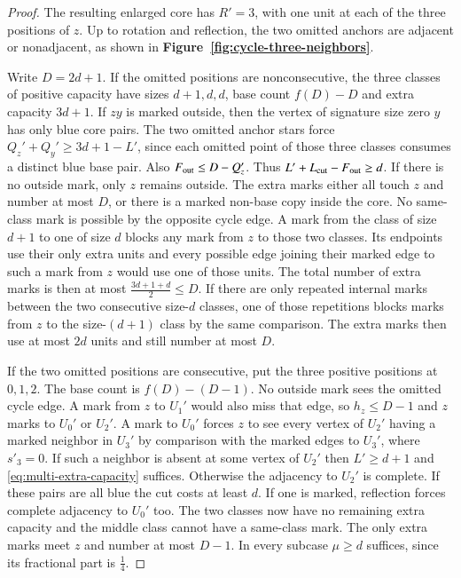 \begin{proof}
The resulting enlarged core has $R'=3$, with one unit at each of the
three positions of $z$. Up to rotation and reflection, the two omitted
anchors are adjacent or nonadjacent, as shown in
\textbf{Figure~\ref{fig:cycle-three-neighbors}}.


Write $D=2d+1$. If the omitted positions are
nonconsecutive, the three classes of positive capacity have sizes
$d+1,d,d$, base count $f(D)-D$ and extra capacity $3d+1$.
If $zy$ is marked outside, then the vertex of signature size zero $y$ has
only blue core pairs. The two omitted anchor stars force
$Q_z'+Q_y'\ge3d+1-L'$, since each omitted point of those three
classes consumes a distinct blue base pair. Also $F_{\rm out}\le D-Q_z'$.
Thus $L'+L_{\rm cut}-F_{\rm out}\ge d$. If there is no outside mark, only
$z$ remains outside. The extra marks either all touch $z$ and
number at most $D$, or there is a marked non-base copy inside
the core. No same-class mark is possible by the opposite cycle
edge. A mark from the class of size $d+1$ to one of size $d$
blocks any mark from $z$ to those two classes. Its endpoints use
their only extra units and every possible edge joining their marked edge to
such a mark from $z$ would use one of those units. The total number
of extra marks is then at most $\frac{3d+1+d}{2}\le D$. If there are
only repeated internal marks between the two consecutive size-$d$
classes, one of those repetitions blocks marks from $z$ to the
size-$(d+1)$ class by the same comparison. The extra marks then
use at most $2d$ units and still number at most $D$.

If the two omitted positions are consecutive, put the three
positive positions at $0,1,2$. The base count is $f(D)-(D-1)$.
No outside mark sees the omitted cycle edge. A mark from $z$ to
$U_1'$ would also miss that edge, so $h_z\le D-1$ and $z$ marks
to $U_0'$ or $U_2'$. A mark to $U_0'$ forces $z$ to see every
vertex of $U_2'$ having a marked neighbor in $U_3'$ by comparison
with the marked edges to $U_3'$, where $s'_3=0$. If such a
neighbor is absent at some vertex of $U_2'$ then $L'\ge d+1$
and \eqref{eq:multi-extra-capacity} suffices. Otherwise the
adjacency to $U_2'$ is complete. If these pairs are all blue the
cut costs at least $d$. If one is marked, reflection forces
complete adjacency to $U_0'$ too. The two classes now have no
remaining extra capacity and the middle class cannot have a
same-class mark. The only extra marks meet $z$ and number at most
$D-1$. In every subcase $\mu\ge d$ suffices, since its fractional
part is $\frac{1}{4}$.


\end{proof}

